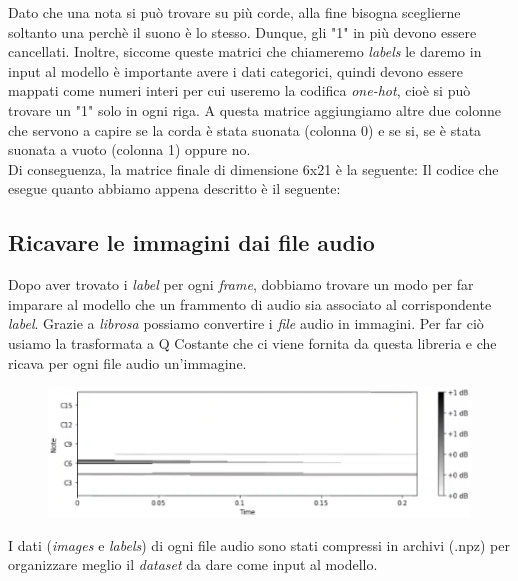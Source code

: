 Dato che una nota si può trovare su più corde, alla fine bisogna sceglierne soltanto una perchè il suono è lo stesso. Dunque, gli "1" in più devono essere cancellati. Inoltre, siccome queste matrici che chiameremo \textit{labels} le daremo in input al modello è importante avere i dati categorici, quindi devono essere mappati come numeri interi per cui useremo la codifica \textit{one-hot}, cioè si può trovare un "1" solo in ogni riga. A questa matrice aggiungiamo altre due colonne che servono a capire se la corda è stata suonata (colonna 0) e se si, se è stata suonata a vuoto (colonna 1) oppure no.\\
\newline
Di conseguenza, la matrice finale di dimensione 6x21 è la seguente:
\vspace*{2ex}
\vspace*{2ex}
Il codice che esegue quanto abbiamo appena descritto è il seguente:
\vspace*{2ex}
\subsection{Ricavare le immagini dai file audio}
Dopo aver trovato i \textit{label} per ogni \textit{frame}, dobbiamo trovare un modo per far imparare al modello che un frammento di audio sia associato al corrispondente \textit{label}.
Grazie a \textit{librosa} possiamo convertire i \textit{file} audio in immagini. Per far ciò usiamo la trasformata a Q Costante che ci viene fornita da questa libreria e che ricava per ogni file audio un'immagine.
\begin{figure}[H]
	\centering
	\includegraphics[scale=0.90]{./images/img7.png}
\end{figure}
\vspace*{2ex}
\vspace*{2ex}
I dati (\textit{images} e \textit{labels}) di ogni file audio sono stati compressi in archivi (.npz) per organizzare meglio il \textit{dataset} da dare come input al modello.
